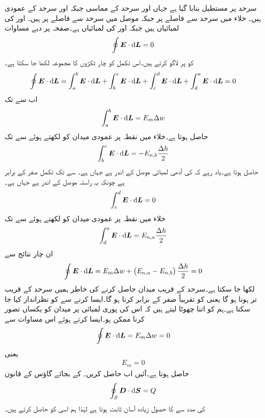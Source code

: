  سرحد پر   مستطیل بنایا گیا ہے جہاں  اور  سرحد کے مماسی جبکہ  اور  سرحد کے عمودی ہیں۔ خلاء میں سرحد سے  فاصلے پر جبکہ  موصل میں سرحد سے   فاصلے پر  ہیں۔ اور  کی لمبائیاں  ہیں جبکہ  اور  کی لمبائیاں  ہے۔صفحہ  پر دیے مساوات  
\begin{align*}
\oint \kvec{E} \cdot \dif \kvec{L}=0
\end{align*}
کو  پر  لاگو کرتے ہیں۔اس تکمل کو چار ٹکڑوں کا مجموعہ لکھا جا سکتا ہے۔
   \begin{align*}
\oint \kvec{E} \cdot \dif \kvec{L}=\int_a^b \kvec{E} \cdot \dif \kvec{L}+\int_b^c \kvec{E} \cdot \dif \kvec{L}+\int_c^d \kvec{E} \cdot \dif \kvec{L}+\int_d^a \kvec{E} \cdot \dif \kvec{L}=0
\end{align*}
اب  سے  تک
\begin{align*}
\int_a^b\kvec{E} \cdot \dif \kvec{L}=E_m \Delta w
\end{align*}
حاصل ہوتا ہے۔خلاء میں نقطہ   پر عمودی میدان کو  لکھتے ہوئے  سے  تک
\begin{align*}
\int_b^c\kvec{E} \cdot \dif \kvec{L}=-E_{n,b} \frac{\Delta h}{2}
\end{align*}
حاصل ہوتا ہے۔یاد رہے کہ  کی آدھی لمبائی موصل کے اندر ہے جہاں  ہے۔ سے  تک تکمل صفر کے برابر ہے چونکہ یہ راستہ موصل کے اندر ہے جہاں  ہے۔
\begin{align*}
\int_c^d\kvec{E} \cdot \dif \kvec{L}=0
\end{align*}
خلاء میں نقطہ   پر عمودی میدان کو  لکھتے ہوئے  سے  تک
\begin{align*}
\int_d^a\kvec{E} \cdot \dif \kvec{L}=E_{n,a} \frac{\Delta h}{2}
\end{align*}
ان چار نتائج سے
\begin{align*}
\oint \kvec{E} \cdot \dif \kvec{L}=E_m \Delta w+\left(E_{n,a}-E_{n,b} \right) \frac{\Delta h}{2}=0
\end{align*}
لکھا جا سکتا ہے۔سرحد کے قریب میدان حاصل کرنے کی خاطر ہمیں سرحد کے قریب تر ہونا ہو گا یعنی  کو تقریباً صفر کے برابر کرنا ہو گا۔ایسا کرنے
 سے  کو نظرانداز  کیا جا سکتا ہے۔ہم  کو اتنا چھوٹا لیتے ہیں کہ اس کی پوری لمبائی پر میدان کو یکساں تصور کرنا ممکن ہو۔ایسا کرتے ہوئے اس مساوات سے
\begin{align*}
\oint \kvec{E} \cdot \dif \kvec{L}=E_m \Delta w=0
\end{align*}
یعنی
\begin{align}\label{مساوات_کپیسٹر_سرحد_موصل_خلاء_مماسی_میدان_صفر}
E_m=0
\end{align}
حاصل ہوتا ہے۔آئیں اب  حاصل کریں۔ کے بجائے گاؤس کے قانون
\begin{align*}
\oint_S \kvec{D} \cdot \dif \kvec{S}=Q
\end{align*}
 کی مدد سے  کا حصول زیادہ آسان ثابت ہوتا ہے لہٰذا ہم اسی کو حاصل کرتے ہیں۔

